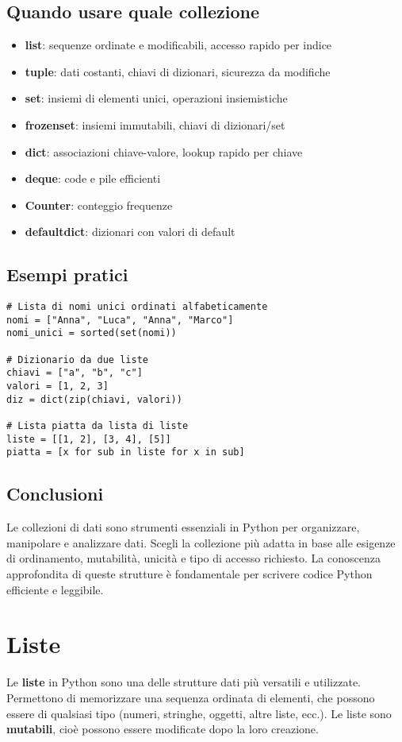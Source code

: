 \documentclass[a4paper,12pt]{article}
\begin{document}
\subsection*{Quando usare quale collezione}
\begin{itemize}
    \item \textbf{list}: sequenze ordinate e modificabili, accesso rapido per indice
    \item \textbf{tuple}: dati costanti, chiavi di dizionari, sicurezza da modifiche
    \item \textbf{set}: insiemi di elementi unici, operazioni insiemistiche
    \item \textbf{frozenset}: insiemi immutabili, chiavi di dizionari/set
    \item \textbf{dict}: associazioni chiave-valore, lookup rapido per chiave
    \item \textbf{deque}: code e pile efficienti
    \item \textbf{Counter}: conteggio frequenze
    \item \textbf{defaultdict}: dizionari con valori di default
\end{itemize}

\subsection*{Esempi pratici}
\begin{lstlisting}
# Lista di nomi unici ordinati alfabeticamente
nomi = ["Anna", "Luca", "Anna", "Marco"]
nomi_unici = sorted(set(nomi))

# Dizionario da due liste
chiavi = ["a", "b", "c"]
valori = [1, 2, 3]
diz = dict(zip(chiavi, valori))

# Lista piatta da lista di liste
liste = [[1, 2], [3, 4], [5]]
piatta = [x for sub in liste for x in sub]
\end{lstlisting}

\subsection*{Conclusioni}
Le collezioni di dati sono strumenti essenziali in Python per organizzare, manipolare e analizzare dati. Scegli la collezione più adatta in base alle esigenze di ordinamento, mutabilità, unicità e tipo di accesso richiesto. La conoscenza approfondita di queste strutture è fondamentale per scrivere codice Python efficiente e leggibile.

\section{Liste}
Le \textbf{liste} in Python sono una delle strutture dati più versatili e utilizzate. Permettono di memorizzare una sequenza ordinata di elementi, che possono essere di qualsiasi tipo (numeri, stringhe, oggetti, altre liste, ecc.). Le liste sono \textbf{mutabili}, cioè possono essere modificate dopo la loro creazione.
\end{document}
